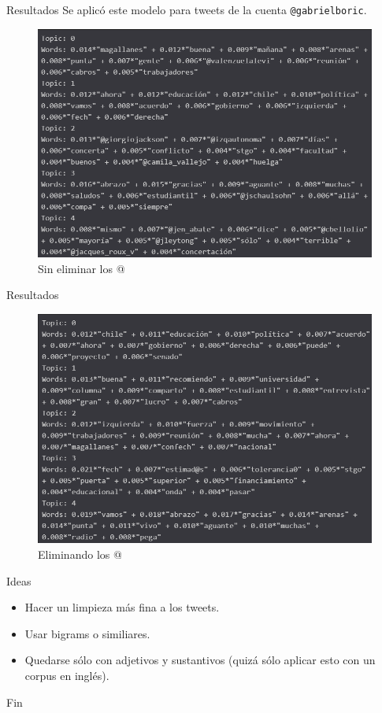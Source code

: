 \documentclass{beamer}
\begin{document}
	\begin{frame}{Resultados}
		Se aplicó este modelo para tweets de la cuenta \texttt{@gabrielboric}.
		\begin{figure}[h]
			\includegraphics[scale=.4]{../imgs/segunda_avance/boric_5topics_arroba_hash.png}
			\caption{Sin eliminar los @}
		\end{figure}
	\end{frame}

	\begin{frame}{Resultados}
		\begin{figure}[h]
			\includegraphics[scale=.4]{../imgs/segunda_avance/boric_5topics.png}
			\caption{Eliminando los @}
		\end{figure}
	\end{frame}

	\begin{frame}{Ideas}
		\begin{itemize}
			\item Hacer un limpieza más fina a los tweets.
			\item Usar bigrams o similiares.
			\item Quedarse sólo con adjetivos y sustantivos (quizá sólo aplicar esto con un corpus en inglés). 
		\end{itemize}
	\end{frame}


	

	\begin{frame}{Fin}
		\centering
	\end{frame}

	
	
\end{document}
